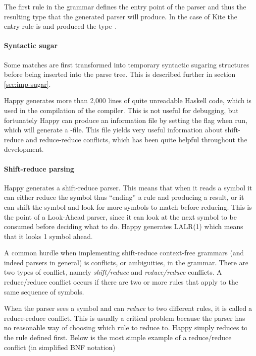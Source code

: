 The first rule in the grammar defines the entry point of the parser and thus the resulting type that the generated parser will produce. In the case of Kite the entry rule is  and produced the type \code{[Decl]}.

\paragraph{Syntactic sugar}
Some matches are first transformed into temporary syntactic sugaring structures before being inserted into the parse tree. This is described further in section \ref{sec:imp-sugar}.

Happy generates more than 2,000 lines of quite unreadable Haskell code, which is used in the compilation of the compiler. This is not useful for debugging, but fortunately Happy can produce an information file by setting the  flag when run, which will generate a -file. This file yields very useful information about shift-reduce and reduce-reduce conflicts, which has been quite helpful throughout the development.

\paragraph{Shift-reduce parsing}
Happy generates a shift-reduce parser. This means that when it reads a symbol it can either reduce the symbol thus ``ending'' a rule and producing a result, or it can shift the symbol and look for more symbols to match before reducing. This is the point of a Look-Ahead parser, since it can look at the next symbol to be consumed before deciding what to do. Happy generates LALR(1) which means that it looks 1 symbol ahead.

A common hurdle when implementing shift-reduce context-free grammars (and indeed parsers in general) is conflicts, or ambiguities, in the grammar. There are two types of conflict, namely \emph{shift/reduce} and \emph{reduce/reduce} conflicts. A reduce/reduce conflict occurs if there are two or more rules that apply to the same sequence of symbols\cite[sec 5.6]{bison13}.


When the parser sees a symbol and can \emph{reduce} to two different rules, it is called a reduce-reduce conflict. This is usually a critical problem because the parser has no reasonable way of choosing which rule to reduce to. Happy simply reduces to the rule defined first. Below is the most simple example of a reduce/reduce conflict (in simplified BNF notation)

